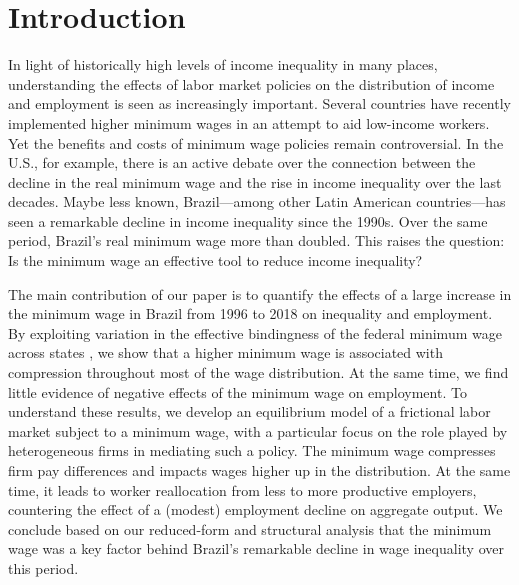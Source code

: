 
\section{Introduction\label{SECTION: Introduction}}

In light of historically high levels of income inequality in many places, understanding the effects of labor market policies on the distribution of income and employment is seen as increasingly important. Several countries have recently implemented higher minimum wages in an attempt to aid low-income workers. Yet the benefits and costs of minimum wage policies remain controversial. In the U.S., for example, there is an active debate over the connection between the decline in the real minimum wage and the rise in income inequality over the last decades. Maybe less known, Brazil---among other Latin American countries---has seen a remarkable decline in income inequality since the 1990s. Over the same period, Brazil's real minimum wage more than doubled. This raises the question: Is the minimum wage an effective tool to reduce income inequality?

The main contribution of our paper is to quantify the effects of a large increase in the minimum wage in Brazil from 1996 to 2018 on inequality and employment. By exploiting variation in the effective bindingness of the federal minimum wage across states \citep{Lee1999,Autor2016}, we show that a higher minimum wage is associated with compression throughout most of the wage distribution. At the same time, we find little evidence of negative effects of the minimum wage on employment. To understand these results, we develop an equilibrium model of a frictional labor market subject to a minimum wage, with a particular focus on the role played by heterogeneous firms in mediating such a policy. The minimum wage compresses firm pay differences and impacts wages higher up in the distribution. At the same time, it leads to worker reallocation from less to more productive employers, countering the effect of a (modest) employment decline on aggregate output. We conclude based on our reduced-form and structural analysis that the minimum wage was a key factor behind Brazil's remarkable decline in wage inequality over this period.

